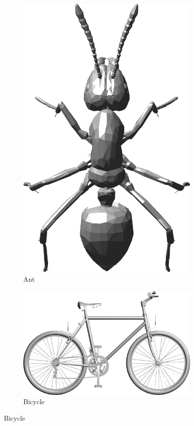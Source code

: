 \begin{figure}
	\begin{subfigure}[t]{0.19\linewidth} \centering
		\includegraphics[width=0.7\linewidth]{./fig/eval/01ant.png}  
		\caption{Ant} 	
	\end{subfigure}
	\begin{subfigure}[t]{0.19\linewidth} \centering
		\includegraphics[width=1\linewidth]{./fig/eval/02bicycle.png}  
		\caption{Bicycle} 	

\end{subfigure}
\end{figure}
